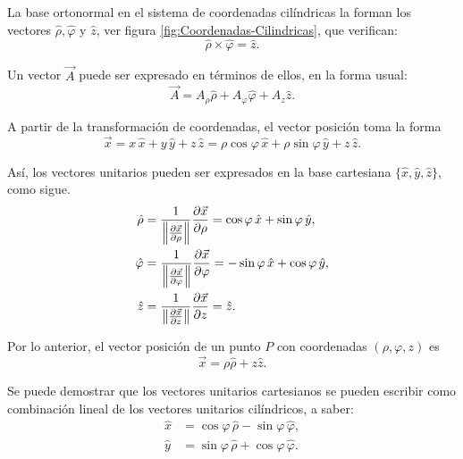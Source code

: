 La base ortonormal en el sistema de coordenadas cilíndricas la forman los vectores $\hat{\rho}, \hat{\varphi}$ y $\hat{z}$, ver figura \ref{fig:Coordenadas-Cilindricas}, que verifican:
\begin{equation}
\hat{\rho} \times \hat{\varphi} = \hat{z}.
\end{equation}


Un vector $\Vec{A}$ puede ser expresado en términos de ellos, en la forma usual:
\begin{equation}
\Vec{A} = A_{\rho} \hat{\rho}  + A_{\varphi} \hat{\varphi} + A_z \hat{z}.
\end{equation}

A partir de la transformación de coordenadas, el vector posición toma la forma
\begin{equation}
\Vec{x} = x \,\hat{x} + y \,\hat{y} + z \,\hat{z} = \rho \cos \varphi \,\hat{x} + \rho \sin \varphi \,\hat{y} + z \,\hat{z}.
\end{equation}

Así, los vectores unitarios pueden ser expresados en la base cartesiana $\{\hat{x}, \hat{y}, \hat{z}\}$, como sigue.
\begin{align}
    \hat{\rho} &= \frac{1}{\left\lVert\frac{\partial \Vec{x}}{\partial \rho}\right\rVert}\frac{\partial \Vec{x}}{\partial \rho} = \cos \varphi \,\hat{x} + \sin \varphi \,\hat{y}, \\
    \hat{\varphi} &= \frac{1}{\left\lVert\frac{\partial \Vec{x}}{\partial \varphi}\right\rVert}\frac{\partial \Vec{x}}{\partial \varphi} = - \sin \varphi \,\hat{x} + \cos \varphi \, \hat{y},  \\
    \hat{z} &= \frac{1}{\left\lVert\frac{\partial \Vec{x}}{\partial z}\right\rVert}\frac{\partial \Vec{x}}{\partial z} = \hat{z} .
\end{align}

Por lo anterior, el vector posición de un punto $P$ con coordenadas $(\rho, \varphi,z)$ es 
\begin{equation}
\vec{x} = \rho \hat{\rho} + z \hat{z}.
\end{equation}

Se puede demostrar que los vectores unitarios cartesianos se pueden escribir como combinación lineal de los vectores unitarios cilíndricos, a saber:
\begin{align}
    \hat{x} &= \cos \varphi \,\hat{\rho} - \sin \varphi \, \hat{\varphi}, \\
    \hat{y} &= \sin\varphi \, \hat{\rho} + \cos \varphi \,\hat{\varphi}.
\end{align}

